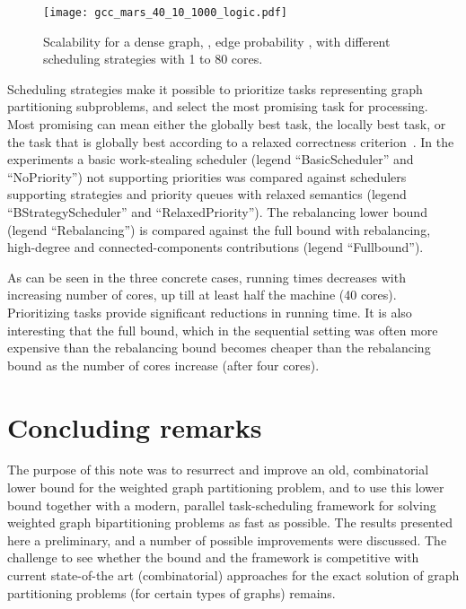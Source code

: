 \documentclass[a4paper,11pt]{article}
\begin{document}
\begin{figure}
  \texttt{[image: gcc\_mars\_40\_10\_1000\_logic.pdf]}
\caption{Scalability for a dense graph, , edge probability
  ,  with different scheduling strategies
  with 1 to 80 cores.}
\label{fig:large-40}
\end{figure}

Scheduling strategies make it possible to prioritize tasks
representing graph partitioning subproblems, and select the most
promising task for processing. Most promising can mean either the
globally best task, the locally best task, or the task that is
globally best according to a relaxed correctness
criterion~\cite{Wimmer14:diss}. In the experiments a basic
work-stealing scheduler (legend ``BasicScheduler'' and ``NoPriority'')
not supporting priorities was compared against schedulers supporting
strategies and priority queues with relaxed semantics (legend
``BStrategyScheduler'' and ``RelaxedPriority''). The rebalancing lower
bound (legend ``Rebalancing'') is compared against the full bound with
rebalancing, high-degree and connected-components contributions
(legend ``Fullbound'').

As can be seen in the three concrete cases, running times decreases
with increasing number of cores, up till at least half the machine (40
cores). Prioritizing tasks provide significant reductions in running
time. It is also interesting that the full bound, which in the
sequential setting was often more expensive than the rebalancing bound
becomes cheaper than the rebalancing bound as the number of cores
increase (after four cores).

\section{Concluding remarks}

The purpose of this note was to resurrect and improve an old,
combinatorial lower bound for the weighted graph partitioning problem,
and to use this lower bound together with a modern, parallel
task-scheduling framework for solving weighted graph bipartitioning
problems as fast as possible. The results presented here a
preliminary, and a number of possible improvements were discussed. The
challenge to see whether the bound and the framework is competitive
with current state-of-the art (combinatorial) approaches for the exact
solution of graph partitioning problems (for certain types of graphs)
remains.



\end{document}

